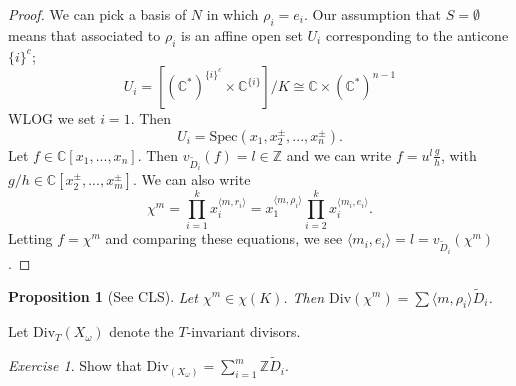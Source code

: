 \documentclass{article}
\newtheorem{prop}[theorem]{Proposition}
\theoremstyle{definition}
\theoremstyle{remark}
\newtheorem{exercise}[theorem]{Exercise}
\numberwithin{theorem}{section}
\newcommand{\C}{\mathbb{C}}
\newcommand{\Z}{\mathbb{Z}}
\newcommand{\Spec}{\text{Spec}}
\newcommand{\Div}{\mathrm{Div}}
\begin{document}
	\begin{proof}
		We can pick a basis of $N$ in which $\rho_i=e_i$. Our assumption that $S=\emptyset$ means that associated to $\rho_i$ is an affine open set $U_i$ corresponding to the anticone $\{i\}^c$;
		$$U_i = \left[
			(\C^\ast)^{\{i\}^c} \times \C^{\{i\}} 
		\right]/K \cong \C\times (\C^\ast)^{n-1}$$
		WLOG we set $i=1$. Then 
		$$U_i = \Spec(x_1,x_2^{\pm},...,x_n^{\pm}).$$
		Let $f\in \C[x_1,...,x_n]$. Then $v_{\tilde{D}_i}(f) = l \in \Z$ and we can write $f=u^l \frac{g}{h}$, with $g/h \in \C[x_2^\pm,...,x_m^\pm]$. We can also write 
		$$\chi^m = \prod_{i=1}^k x_i^{\langle m, r_i\rangle} = x_1^{\langle m, \rho_i\rangle}\prod_{i=2}^k x_i^{\langle m_i, e_i\rangle}.$$
		Letting $f=\chi^m$ and comparing these equations, we see $\langle m_i, e_i\rangle = l = v_{\tilde{D}_i}(\chi^m)$.
	\end{proof}
	\begin{prop}[See CLS]
		Let $\chi^m \in \chi(K)$. Then $\Div(\chi^m) = \sum \langle m, \rho_i\rangle \tilde{D}_i$.
	\end{prop}
	Let $\Div_T(X_\omega)$ denote the $T$-invariant divisors. 
	\begin{exercise}
	Show that $\Div_(X_\omega) = \sum_{i=1}^m \Z \tilde{D}_i$.
	\end{exercise}
\end{document}
